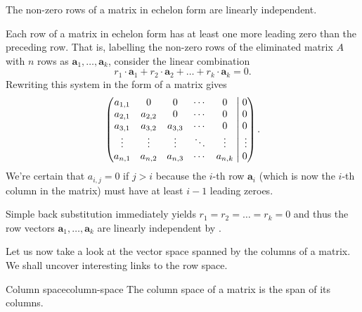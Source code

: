 \begin{lemma}{}{}
 The non-zero rows of a matrix in echelon form are linearly independent.
\end{lemma}
\begin{lemproof}
 Each row of a matrix in echelon form has at least one more leading zero than
 the preceding row. That is, labelling the non-zero rows of the eliminated
 matrix $A$ with $n$ rows as $\mathbf{a}_1,\ldots,\mathbf{a}_k$, consider the
 linear combination
 \[
  r_1 \cdot \mathbf{a}_1 + r_2 \cdot \mathbf{a}_2 + \ldots + r_k \cdot
  \mathbf{a}_k = 0.
 \]
 Rewriting this system in the form of a matrix gives
 \[
  \left(
   \begin{matrix*}[c]
    a_{1,1} & 0 & 0 & \cdots & 0\\
    a_{2,1} & a_{2,2} & 0 & \cdots & 0\\
    a_{3,1} & a_{3,2} & a_{3,3} & \cdots & 0\\
    \vdots & \vdots & \vdots & \ddots & \vdots\\
    a_{n,1} & a_{n,2} & a_{n,3} & \cdots & a_{n,k}
   \end{matrix*}
   \hspace{1mm}
  \right|
  \left.
   \begin{matrix*}[r]
    0\\
    0\\
    0\\
    \vdots\\
    0
   \end{matrix*}
  \right).
 \]
 We're certain that $a_{i,j} = 0$ if $j > i$ because the $i$-th row
 $\mathbf{a}_i$ (which is now the $i$-th column in the matrix) must have at
 least $i - 1$ leading zeroes.

 Simple back substitution immediately yields $r_1 = r_2 = \ldots = r_k = 0$ and
 thus the row vectors $\mathbf{a}_1,\ldots,\mathbf{a}_k$ are linearly
 independent by .
\end{lemproof}

Let us now take a look at the vector space spanned by the columns of a matrix.
We shall uncover interesting links to the row space.

\begin{definition}{Column space}{column-space}
 The column space of a matrix is the span of its columns.
\end{definition}

